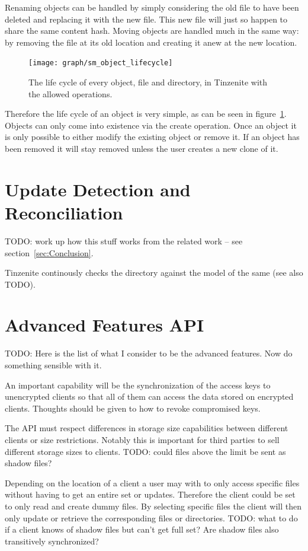 Renaming objects can be handled by simply considering the old file to have been deleted and replacing it with the new file.
This new file will just so happen to share the same content hash.
Moving objects are handled much in the same way: by removing the file at its old location and creating it anew at the new location.

\begin{figure}[htp]
\centering
    \texttt{[image: graph/sm\_object\_lifecycle]}
\caption[Object State Diagram]{The life cycle of every object, file and directory, in Tinzenite with the allowed operations.}
\label{diagram:object_operations}
\end{figure}

Therefore the life cycle of an object is very simple, as can be seen in figure~\ref{diagram:object_operations}.
Objects can only come into existence via the create operation.
Once an object it is only possible to either modify the existing object or remove it.
If an object has been removed it will stay removed unless the user creates a new clone of it.

\section{Update Detection and Reconciliation}
\label{sec:Update Detection and Reconciliation}

TODO: work up how this stuff works from the related work – see section~\ref{sec:Conclusion}.

Tinzenite continously checks the directory against the model of the same (see also TODO).

\section{Advanced Features API}

TODO: Here is the list of what I consider to be the advanced features.
Now do something sensible with it.

\begin{description}[leftmargin=2em,style=nextline,noitemsep,nolistsep]
\item[Encryption Key Management]
    An important capability will be the synchronization of the access keys to unencrypted clients so that all of them can access the data stored on encrypted clients.
    Thoughts should be given to how to revoke compromised keys.
\item[Space Management]
    The API must respect differences in storage size capabilities between different clients or size restrictions.
    Notably this is important for third parties to sell different storage sizes to clients.
    TODO: could files above the limit be sent as shadow files?
\item[Shadow Files]
    Depending on the location of a client a user may with to only access specific files without having to get an entire set or updates.
    Therefore the client could be set to only read and create dummy files.
    By selecting specific files the client will then only update or retrieve the corresponding files or directories.
    TODO: what to do if a client knows of shadow files but can't get full set?
    Are shadow files also transitively synchronized?
\end{description}
